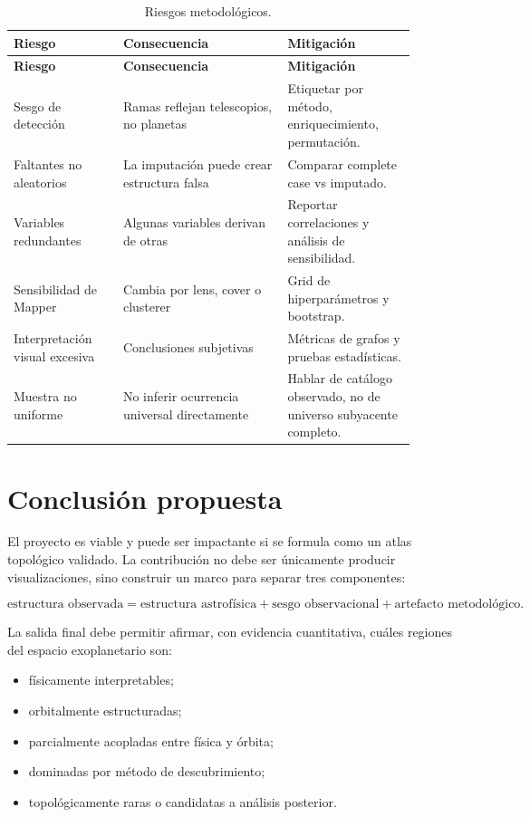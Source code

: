\documentclass[11pt,letterpaper]{article}
\begin{document}
\begin{longtable}{p{0.24\linewidth}p{0.36\linewidth}p{0.28\linewidth}}
\caption{Riesgos metodológicos.}\\
\toprule
\textbf{Riesgo} & \textbf{Consecuencia} & \textbf{Mitigación} \\
\midrule
\endfirsthead
\toprule
\textbf{Riesgo} & \textbf{Consecuencia} & \textbf{Mitigación} \\
\midrule
\endhead
Sesgo de detección & Ramas reflejan telescopios, no planetas & Etiquetar por método, enriquecimiento, permutación. \\
Faltantes no aleatorios & La imputación puede crear estructura falsa & Comparar complete case vs imputado. \\
Variables redundantes & Algunas variables derivan de otras & Reportar correlaciones y análisis de sensibilidad. \\
Sensibilidad de Mapper & Cambia por lens, cover o clusterer & Grid de hiperparámetros y bootstrap. \\
Interpretación visual excesiva & Conclusiones subjetivas & Métricas de grafos y pruebas estadísticas. \\
Muestra no uniforme & No inferir ocurrencia universal directamente & Hablar de catálogo observado, no de universo subyacente completo. \\
\bottomrule
\end{longtable}

\section{Conclusión propuesta}

El proyecto es viable y puede ser impactante si se formula como un atlas topológico validado. La contribución no debe ser únicamente producir visualizaciones, sino construir un marco para separar tres componentes:

\begin{equation}
\text{estructura observada}=\text{estructura astrofísica}+\text{sesgo observacional}+\text{artefacto metodológico}.
\end{equation}

La salida final debe permitir afirmar, con evidencia cuantitativa, cuáles regiones del espacio exoplanetario son:

\begin{itemize}
    \item físicamente interpretables;
    \item orbitalmente estructuradas;
    \item parcialmente acopladas entre física y órbita;
    \item dominadas por método de descubrimiento;
    \item topológicamente raras o candidatas a análisis posterior.
\end{itemize}
\end{document}
